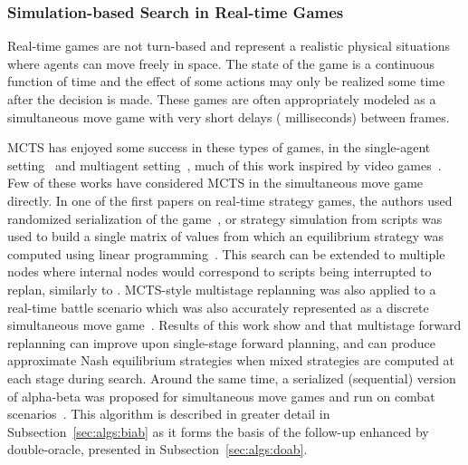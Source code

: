 
\subsubsection{Simulation-based Search in Real-time Games}


Real-time games are not turn-based and represent a realistic physical situations where agents can move freely in space. 
The state of the game is a continuous function of time and the effect of some actions may only be realized some time 
after the decision is made. These games are often appropriately modeled as a simultaneous move game with very short 
delays ( milliseconds) between frames. 

MCTS has enjoyed some success in these types of games, in the single-agent 
setting~\cite{Pepels14Monte,Perez14PTSP} and multiagent setting~\cite{Balla09UCT}, much of this work inspired by video 
games~\cite{Cowling13Video,BellemareNVB13,Ontanon13RTSSurvey}. Few of these works have considered MCTS
in the simultaneous move game directly. 
In one of the first papers on real-time strategy games, the authors used randomized serialization 
of the game~\cite{kovarsky2005heuristic}, or strategy simulation
from scripts was used to build a single matrix of values from which an equilibrium strategy was 
computed using linear programming~\cite{Sailor07adversarial}.  
This search can be extended to multiple nodes where internal nodes would correspond to scripts being interrupted to replan, similarly to \cite{lisy2009gbgts}.
MCTS-style multistage replanning was also applied to a real-time battle scenario which was also accurately
represented as a discrete simultaneous move game~\cite{Beard12Using}. Results of this work show and that multistage
forward replanning can improve upon single-stage forward planning, and can produce approximate Nash equilibrium strategies
when mixed strategies are computed at each stage during search.
Around the same time, a serialized (sequential) version of alpha-beta was proposed for simultaneous move games 
and run on combat scenarios~\cite{Churchill2012Fast}. This algorithm is described in greater detail in
Subsection~\ref{sec:algs:biab} as it forms the basis of the follow-up enhanced by
double-oracle, presented in Subsection~\ref{sec:algs:doab}.

